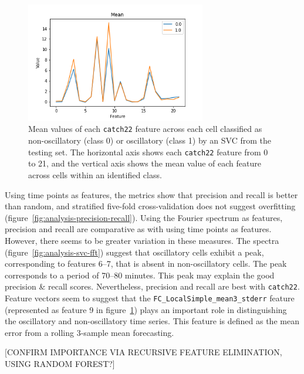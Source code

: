 \begin{figure}
  \centering
  \includegraphics[width=0.7\textwidth]{catch22_training_featurevector_mean}
  \caption{
    Mean values of each \texttt{catch22} feature across each cell classified as non-oscillatory (class 0) or oscillatory (class 1) by an SVC from the testing set.
    The horizontal axis shows each \texttt{catch22} feature from 0 to 21, and the vertical axis shows the mean value of each feature across cells within an identified class.
  }
  \label{fig:analysis-svc-catch22}
\end{figure}

Using time points as features, the metrics show that precision and recall is better than random, and stratified five-fold cross-validation does not suggest overfitting (figure~\ref{fig:analysis-precision-recall}).
Using the Fourier spectrum as features, precision and recall are comparative as with using time points as
features.
However, there seems to be greater variation in these measures.
The spectra (figure~\ref{fig:analysis-svc-fft}) suggest that oscillatory cells exhibit a peak, corresponding to features 6--7, that is absent in non-oscillatory cells.
The peak corresponds to a period of 70--80 minutes.
This peak may explain the good precision \& recall scores.
Nevertheless, precision and recall are best with \texttt{catch22}.
Feature vectors seem to suggest that the \texttt{FC\_LocalSimple\_mean3\_stderr} feature (represented as feature 9 in figure~\ref{fig:analysis-svc-catch22}) plays an important role in distinguishing the oscillatory and non-oscillatory time series.
This feature is defined as the mean error from a rolling 3-sample mean forecasting.

[CONFIRM IMPORTANCE VIA RECURSIVE FEATURE ELIMINATION, USING RANDOM FOREST?]


